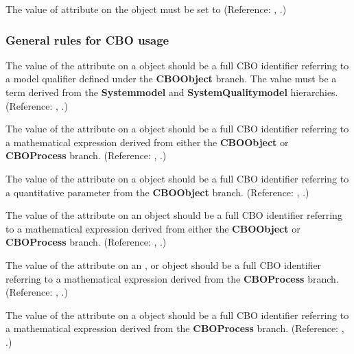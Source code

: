  {The value of attribute  on
  the \SBML object must be set to  (Reference: \sbmlthreedynamic, .) }


\subsubsection*{General rules for CBO usage} 

 {The value of the attribute  on a \Model object should be a full CBO identifier referring to a model qualifier defined under the \textbf{CBO\textunderscore Object} branch. The value must be a term derived from the \textbf{System\textemdash model} and \textbf{SystemQuality\textemdash model} hierarchies. (Reference: \sbmlthreedynamic, .)}

 {The value of the attribute  on a \FunctionDefinition object should be a full CBO identifier referring to a mathematical expression derived from either the \textbf{CBO\textunderscore Object} or \textbf{CBO\textunderscore Process} branch. (Reference: \sbmlthreedynamic, .)}

 {The value of the attribute  on a \Parameter object should be a full CBO identifier referring to a quantitative parameter from the \textbf{CBO\textunderscore Object} branch.  (Reference: \sbmlthreedynamic, .)}

 {The value of the attribute  on an \InitialAssignment object should be a full CBO identifier referring to a mathematical expression derived from either the \textbf{CBO\textunderscore Object} or \textbf{CBO\textunderscore Process} branch. (Reference: \sbmlthreedynamic, .)}

 {The value of the attribute  on an \AlgebraicRule, \RateRule or \AssignmentRule object should be a full CBO identifier referring to a mathematical expression derived from the \textbf{CBO\textunderscore Process} branch. (Reference: \sbmlthreedynamic, .)}

 {The value of the attribute  on a \Constraint object should be a full CBO identifier referring to a mathematical expression derived from the \textbf{CBO\textunderscore Process} branch. (Reference: \sbmlthreedynamic, .)}

